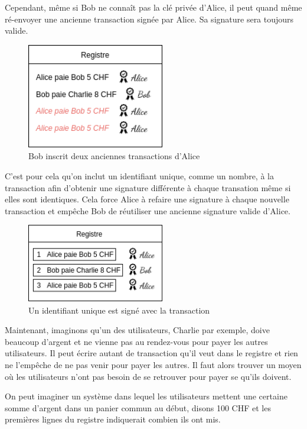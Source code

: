 Cependant, même si Bob ne connaît pas la clé privée d'Alice, il peut quand même ré-envoyer une ancienne transaction signée par Alice. Sa signature sera toujours valide.

\begin{figure}[H]
  \centering
  \includegraphics[width=6cm]{images/crypto_4.png}
  \caption{Bob inscrit deux anciennes transactions d'Alice}
\end{figure}

C'est pour cela qu'on inclut un identifiant unique, comme un nombre, à la transaction afin d'obtenir une signature différente à chaque transation même si elles sont identiques. Cela force Alice à refaire une signature à chaque nouvelle transaction et empêche Bob de réutiliser une ancienne signature valide d'Alice.

\begin{figure}[H]
  \centering
  \includegraphics[width=6cm]{images/crypto_5.png}
  \caption{Un identifiant unique est signé avec la transaction}
\end{figure}

Maintenant, imaginons qu'un des utilisateurs, Charlie par exemple, doive beaucoup d'argent et ne vienne pas au rendez-vous pour payer les autres utilisateurs. Il peut écrire autant de transaction qu'il veut dans le registre et rien ne l'empêche de ne pas venir pour payer les autres. Il faut alors trouver un moyen où les utilisateurs n'ont pas besoin de se retrouver pour payer se qu'ils doivent.

On peut imaginer un système dans lequel les utilisateurs mettent une certaine somme d'argent dans un panier commun au début, disons 100 CHF et les premières lignes du registre indiquerait combien ils ont mis.

